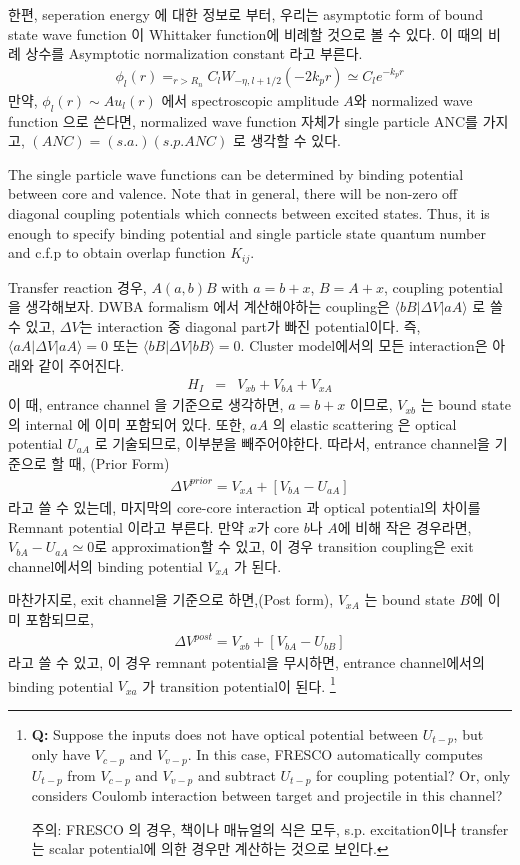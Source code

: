 \documentclass[11pt]{book}
\def\la{\langle}
\def\ra{\rangle}
\newcommand{\bea}{\begin{eqnarray}}
\newcommand{\eea}{\end{eqnarray}}
\begin{document}
한편, seperation energy 에 대한 정보로 부터, 
우리는 asymptotic form of bound state wave function 이 Whittaker function에 
비례할 것으로 볼 수 있다. 이 때의 비례 상수를 Asymptotic normalization constant 라고 부른다.
\bea 
\phi_l(r)=_{r>R_n} C_l W_{-\eta,l+1/2}(-2k_p r)\simeq C_l e^{-k_p r}
\eea  
만약, $\phi_l(r)\sim A u_l(r)$ 에서 spectroscopic amplitude $A$와 normalized wave function
으로 쓴다면, normalized wave function 자체가 single particle ANC를 가지고, 
$(ANC)=(s.a.)(s.p.ANC)$ 로 생각할 수 있다. 

The single particle wave functions can be determined by binding potential
between core and valence. Note that in general,
there will be non-zero off diagonal coupling potentials which
connects between excited states. 
Thus, it is enough to specify binding potential and 
single particle state quantum number and c.f.p 
to obtain overlap function $K_{ij}$. 

Transfer reaction 경우, $A(a,b)B$ with 
$a=b+x$, $B=A+x$, coupling potential을 생각해보자. 
DWBA formalism 에서 계산해야하는 coupling은 $\la bB|\Delta V| a A\ra$ 로 
쓸 수 있고, $\Delta V$는 interaction 중 diagonal part가 빠진 potential이다. 
즉, $\la a A|\Delta V| a A\ra =0$ 또는 $\la b B|\Delta V| b B\ra=0$. 
Cluster model에서의 모든 interaction은 아래와 같이 주어진다.
\bea 
H_I&=& V_{xb}+V_{bA}+V_{xA}
\eea 
이 때, entrance channel 을 기준으로 생각하면, $a=b+x$ 이므로, $V_{xb}$ 는 bound state 의 
internal 에 이미 포함되어 있다. 또한, $aA$ 의 elastic scattering 은 optical potential 
$U_{aA}$ 로 기술되므로, 이부분을 빼주어야한다. 따라서, entrance channel을 기준으로 할 때,
(Prior Form)
\bea 
\Delta V^{prior}= V_{x A}+ [ V_{bA}- U_{aA}]
\eea 
라고 쓸 수 있는데, 마지막의 core-core interaction 과 optical potential의 차이를 
Remnant potential 이라고 부른다. 만약 $x$가 core $b$나 $A$에 비해 작은 경우라면,
$V_{bA}-U_{aA}\simeq 0$로 approximation할 수 있고, 이 경우 transition coupling은 
exit channel에서의 binding potential $V_{xA}$ 가 된다. 

마찬가지로, exit channel을 기준으로 하면,(Post form),
$V_{xA}$ 는 bound state $B$에 이미 포함되므로,
\bea 
\Delta V^{post} = V_{x b}+[ V_{bA}-U_{bB} ]
\eea 
라고 쓸 수 있고, 이 경우 remnant potential을 무시하면, 
entrance channel에서의 binding potential $V_{xa}$ 가 transition potential이 된다. 
\footnote{
{\bf Q:} Suppose the inputs does not have optical potential
between $U_{t-p}$, but only have $V_{c-p}$ and $V_{v-p}$. 
In this case, FRESCO automatically computes $U_{t-p}$ from 
$V_{c-p}$ and $V_{v-p}$ and subtract $U_{t-p}$ for 
coupling potential? Or, only considers Coulomb interaction 
between target and projectile in this channel? 

주의: FRESCO 의 경우, 책이나 매뉴얼의 식은 모두,
s.p. excitation이나 transfer는 scalar potential에 의한 경우만
계산하는 것으로 보인다.
}
\end{document}
